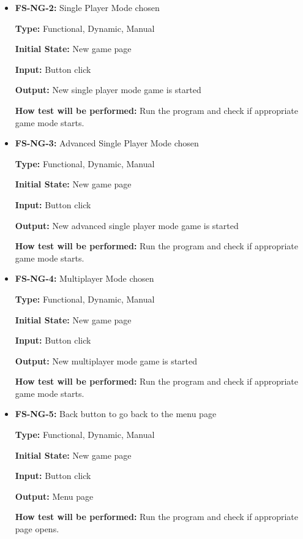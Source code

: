\documentclass[12pt,letterpaper]{article}
\begin{document}
\begin{reqbox}
	\begin{itemize}
	\item \textbf{FS-NG-2: }Single Player Mode chosen

	\textbf{Type: }Functional, Dynamic, Manual

	\textbf{Initial State: }New game page

	\textbf{Input: }Button click

	\textbf{Output: }New single player mode game is started

	\textbf{How test will be performed: }Run the program and check if appropriate game mode starts.
	\end{itemize}
\end{reqbox}

\begin{reqbox}
	\begin{itemize}
	\item \textbf{FS-NG-3: }Advanced Single Player Mode chosen

	\textbf{Type: }Functional, Dynamic, Manual

	\textbf{Initial State: }New game page

	\textbf{Input: }Button click

	\textbf{Output: }New advanced single player mode game is started

	\textbf{How test will be performed: }Run the program and check if appropriate game mode starts.
	\end{itemize}
\end{reqbox}

\begin{reqbox}
	\begin{itemize}
	\item \textbf{FS-NG-4: }Multiplayer Mode chosen

	\textbf{Type: }Functional, Dynamic, Manual

	\textbf{Initial State: }New game page

	\textbf{Input: }Button click

	\textbf{Output: }New multiplayer mode game is started

	\textbf{How test will be performed: }Run the program and check if appropriate game mode starts.
	\end{itemize}
\end{reqbox}

\begin{reqbox}
	\begin{itemize}
	\item \textbf{FS-NG-5: }Back button to go back to the menu page

	\textbf{Type: }Functional, Dynamic, Manual

	\textbf{Initial State: }New game page

	\textbf{Input: }Button click

	\textbf{Output: }Menu page

	\textbf{How test will be performed: }Run the program and check if appropriate page opens.
	\end{itemize}
\end{reqbox}
\end{document}
